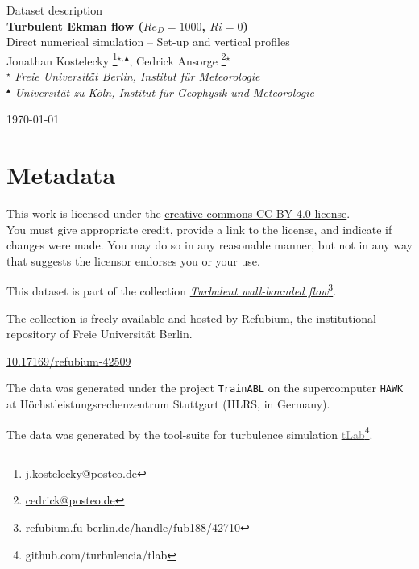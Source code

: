 \documentclass[11pt]{article}
\date{\nodate}
\makeatletter
\newcommand{\dstitle}{Turbulent Ekman flow ($Re_D=1000$, $Ri=0$)}
\newcommand{\subtitle}{Direct numerical simulation -- Set-up and vertical profiles}
\newcommand{\doi}{10.17169/refubium-42509}
\newcommand{\tlabName}{\textcolor{gray}{tLab}}
\newcommand{\authors}{
    Jonathan Kostelecky \footnote{\href{mailto:j.kostelecky@posteo.de}{j.kostelecky@posteo.de}}$^{\star,\blacktriangle}$, \hspace{0.05cm}  
    Cedrick Ansorge     \footnote{\href{mailto:cedrick@posteo.de}{cedrick@posteo.de}}$^\star$ \\  
    {\small \light{$^\star$ \emph{ Freie Universit\"at Berlin, Institut f\"ur Meteorologie} \\
    $^{\blacktriangle}$ \emph{Universit\"at zu K\"oln, Institut f\"ur Geophysik und Meteorologie}}}}
\newcommand{\light}[1]{\textcolor{black!80}{#1}}
\newcommand{\printdoi}[1]{\href{https://dx.doi.org/#1}{#1}}
\makeatother
\begin{document}
{ \selectfont
\begin{centering}

 \light{\large Dataset description} \\[1em] 
 {\LARGE \bfseries \sffamily\dstitle} \\[1em]
 \light{\large\subtitle} \\[1em]
 \authors\\ 
\end{centering}
\light{\hfill \today}
}


\section{Metadata}
\begin{description}
\sffamily
\item[\textcopyright] This work is licensed under the \href{https://creativecommons.org/licenses/by/4.0}{creative commons CC BY 4.0 license}. \\ {\small\light{You must give appropriate credit, provide a link to the license, and indicate if changes were made. You may do so in any reasonable manner, but not in any way that suggests the licensor endorses you or your use. }}
\item[\sffamily Collection] This dataset is part of the collection \href{https://refubium.fu-berlin.de/handle/fub188/42710}{\emph{Turbulent wall-bounded flow}\footnote{\url{refubium.fu-berlin.de/handle/fub188/42710}}}.

{\small \light{The collection is freely available and hosted by Refubium, the  institutional repository of Freie Universit\"at Berlin.}}

\item[\sffamily DOI]\printdoi{\doi}
\item[\sffamily HPC systems] The data was generated under the project \texttt{TrainABL} on the supercomputer \texttt{HAWK} at Höchstleistungsrechenzentrum Stuttgart (HLRS, in Germany). 
\item[\sffamily Code] The data was generated by the tool-suite for turbulence simulation \href{https://github.com/turbulencia/tlab}{\tlabName\footnote{\url{github.com/turbulencia/tlab}}}.
\end{description}
\end{document}
